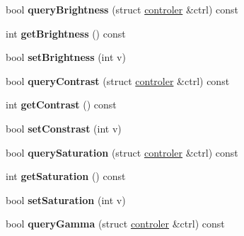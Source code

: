 \begin{DoxyCompactItemize}
\item 
bool {\bfseries query\+Brightness} (struct \hyperlink{structcontroler}{controler} \&ctrl) const \hypertarget{classCamera_ad4208b2d5ae94625090ebb8fbb322ba4}{}\label{classCamera_ad4208b2d5ae94625090ebb8fbb322ba4}

\item 
int {\bfseries get\+Brightness} () const \hypertarget{classCamera_a177add712ab5c9a53b654b3a5e5ce396}{}\label{classCamera_a177add712ab5c9a53b654b3a5e5ce396}

\item 
bool {\bfseries set\+Brightness} (int v)\hypertarget{classCamera_a6371dde083125581c1287b83ff58158f}{}\label{classCamera_a6371dde083125581c1287b83ff58158f}

\item 
bool {\bfseries query\+Contrast} (struct \hyperlink{structcontroler}{controler} \&ctrl) const \hypertarget{classCamera_acb5c62f298f64177f9aad5448c134567}{}\label{classCamera_acb5c62f298f64177f9aad5448c134567}

\item 
int {\bfseries get\+Contrast} () const \hypertarget{classCamera_a1fa662f08c11d0b64603a335171f42c6}{}\label{classCamera_a1fa662f08c11d0b64603a335171f42c6}

\item 
bool {\bfseries set\+Constrast} (int v)\hypertarget{classCamera_ab1ec015b46c0d2af19579140c1129835}{}\label{classCamera_ab1ec015b46c0d2af19579140c1129835}

\item 
bool {\bfseries query\+Saturation} (struct \hyperlink{structcontroler}{controler} \&ctrl) const \hypertarget{classCamera_ac13cc2837539bbfcad04450c79abae60}{}\label{classCamera_ac13cc2837539bbfcad04450c79abae60}

\item 
int {\bfseries get\+Saturation} () const \hypertarget{classCamera_a260548be8d455f684cd51e39caea3c52}{}\label{classCamera_a260548be8d455f684cd51e39caea3c52}

\item 
bool {\bfseries set\+Saturation} (int v)\hypertarget{classCamera_ab8fecb1d27e872110fa74621f766fa79}{}\label{classCamera_ab8fecb1d27e872110fa74621f766fa79}

\item 
bool {\bfseries query\+Gamma} (struct \hyperlink{structcontroler}{controler} \&ctrl) const \hypertarget{classCamera_ac6682015ed4ec29ad10f1da43ecbada9}{}\label{classCamera_ac6682015ed4ec29ad10f1da43ecbada9}


\end{DoxyCompactItemize}
